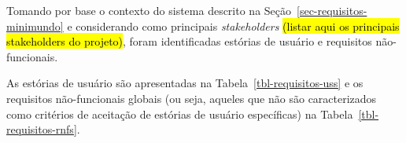 Tomando por base o contexto do sistema descrito na Seção~\ref{sec-requisitos-minimundo} e considerando como principais \textit{stakeholders} \hl{(listar aqui os principais stakeholders do projeto)}, foram identificadas estórias de usuário e requisitos não-funcionais.

As estórias de usuário são apresentadas na Tabela~\ref{tbl-requisitos-uss} e os requisitos não-funcionais globais (ou seja, aqueles que não são caracterizados como critérios de aceitação de estórias de usuário específicas) na Tabela~\ref{tbl-requisitos-rnfs}.

\renewcommand*\theuscount{US-\arabic{uscount}}
\newcommand*\US{\refstepcounter{uscount}\theuscount}
\setcounter{uscount}{0}

\newcommand{\userstory}[5]{
	\\\hline
	\cellcolor{lightgray}\textbf{ID:} & \US\label{#1} & 
	\cellcolor{lightgray}\textbf{Depende:} & #2 & 
	\cellcolor{lightgray}\textbf{Prioridade:} & #3 \\\hline
	\cellcolor{lightgray}\textbf{Descrição:} & 
	\multicolumn{5}{|p{12cm}|}{#4}\\\hline
	\cellcolor{lightgray}\parbox{2.5cm}{\raggedleft \textbf{Critérios de\\Aceitação:}} & 
	\multicolumn{5}{|p{12cm}|}{
		\parbox{12cm}{
			\begin{enumerate}[leftmargin=15mm,label=-- CA\arabic*:]\itemsep-2mm
				#5
			\end{enumerate}
		}		
	}\\\hline
	\multicolumn{6}{c}{}
}


